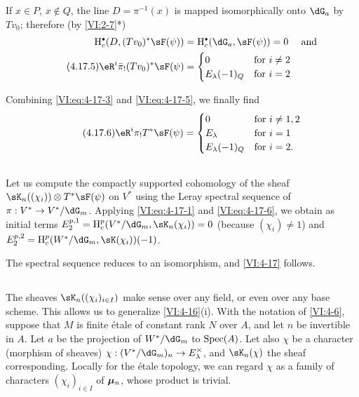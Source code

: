 If $x\in P$, $x\notin Q$, the line $D=\pi^{-1}(x)$ is mapped 
isomorphically onto $\dG_a$ by $T v_0$; therefore (by 
\ref{VI:2-7}*) 
\begin{align} \notag 
  \h_c^\bullet(D,(T v_0)^\ast \sF(\psi)) &= \h_c^\bullet(\dG_a,\sF(\psi)) = 0 && \text{and} \\
  \tag{4.17.5}\label{VI:eq:4-17-5}
  \eR^i \bar\pi_! (T v_0)^\ast \sF(\psi) 
    &= \begin{cases} 
         0 & \text{for $i\ne 2$} \\
         E_\lambda(-1)_Q & \text{for $i=2$} 
       \end{cases} 
\end{align}

Combining \eqref{VI:eq:4-17-3} and \eqref{VI:eq:4-17-5}, we finally find 
\begin{equation*}\tag{4.17.6}\label{VI:eq:4-17-6}
  \eR^i \pi_! T^\ast\sF(\psi) = 
    \begin{cases}
      0 & \text{for $i\ne 1,2$} \\
      E_\lambda & \text{for $i=1$} \\
      E_\lambda(-1)_Q & \text{for $i=2$.} 
    \end{cases}
\end{equation*}





\subsection{}\label{VI:4-18}

Let us compute the compactly supported cohomology of the sheaf 
$\sK_n((\chi_i))\otimes T^\ast \sF(\psi)$ on $V^\ast$ using the 
Leray spectral sequence of $\pi:V^\ast\to V^\ast/\dG_m$. Applying 
\eqref{VI:eq:4-17-1} and \eqref{VI:eq:4-17-6}, we obtain as initial terms 
$E_2^{p,1} = \h_c^p(V^\ast/\dG_m,\sK_n(\chi_i)) = 0$ (because $(\chi_i)\ne 1$) 
and $E_2^{p,2} = \h_c^p(W^\ast/\dG_m,\sK(\chi_i))(-1)$. 

The spectral sequence reduces to an isomorphism, and \ref{VI:4-17} follows. 





\subsection{}\label{VI:4-19}

The sheaves $\sK_n((\chi_i)_{i\in I})$ make sense over any field, 
or even over any base scheme. This allows us to generalize 
\ref{VI:4-16}(i). With the notation of \ref{VI:4-6}, suppose that $M$ is finite 
étale of constant rank $N$ over $A$, and let $n$ be invertible in $A$. 
Let $a$ be the projection of $W^\ast/\dG_m$ to $\operatorname{Spec}(A)$. Let also $\chi$ be 
a character (morphism of sheaves) 
$\chi:(V^\ast/\dG_m)_n \to E_\lambda^\times$, and $\sK_n(\chi)$ the sheaf 
corresponding. Locally for the étale topology, we can regard $\chi$ 
as a family of characters $(\chi_i)_{i\in I}$ of ${\bm\mu}_n$, whose product is 
trivial.

